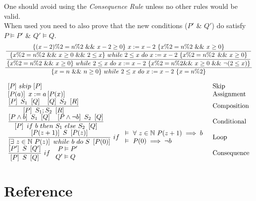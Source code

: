 \documentclass[11pt,a4paper]{article}
\begin{document}
One should avoid using the \textit{Consequence Rule} unless no other rules would be valid.\\
When used you need to also prove that the new conditions ($P'$ \& $Q'$) do satisfy $P\vDash P'$ \& $Q'\vDash Q$.\\

\[
\dfrac
{\dfrac{\{(x-2)\%2=n\%2\ \&\&\ x-2\geq0\}\ x:=x-2\ \{x\%2=n\%2\ \&\&\ x\geq0\}}
{\dfrac
{\{x\%2=n\%2\ \&\&\ x\geq0\ \&\&\ 2\leq x\}\ while\ 2\leq x\ do\ x:=x-2\ \{x\%2=n\%2\\ \&\&\ x\geq0\}}
{\{x\%2=n\%2\ \&\&\ x\geq0\}\ while\ 2\leq x\ do\ x:=x-2\ \{x\%2=n\%2\\ \&\&\ x\geq0\ \&\&\ \neg(2\leq x)\}}
}}
{\{x=n\ \&\&\ n\geq0\}\ while\ 2\leq x\ do\ x:=x-2\ \{x=n\%2\}}
\]

\[\begin{array}{ll}
[P]\ skip\ [P]&\mathrm{Skip}\\
\left[P(a)\right]\ x:=a \left[P(x)\right]&\mathrm{Assignment}\\
\dfrac{\left[P\right]\ S_1\ \left[Q\right]\quad\left[Q\right]\ S_2\ \left[R\right]}{\left[P\right]\ S_1;S_2\ \left[R\right]}&\mathrm{Composition}\\
\dfrac{\left[P\wedge b\right]\ S_1\ \left[Q\right]\quad\left[P\wedge\neg b\right]\ S_2\ \left[Q\right]}{\left[P\right]\ if\ b\ then\ S_1\ else\ S_2\ \left[Q\right]}&\mathrm{Conditional}\\
\dfrac{\left[P(z+1)\right]\ S\ \left[P(z)\right]}{\left[\exists\ z\in\mathbb{N}\ P(z)\right]\ while\ b\ do\ S\ \left[P(0)\right]}\ if\ \begin{array}{l}
\vDash\ \forall\ z\in\mathbb{N}\ P(z+1)\implies b\\
\vDash\ P(0)\implies\neg b
\end{array}&\mathrm{Loop}\\
\dfrac{\left[P'\right]\ S\ \left[Q'\right]}{\left[P\right]\ S\ \left[Q\right]}\ if\ \begin{array}{l}\
P\vDash P'\\
Q'\vDash Q
\end{array}&\mathrm{Consequence}\\
\end{array}\]

\newpage
\setcounter{section}{-1}
\section{Reference}
\end{document}
